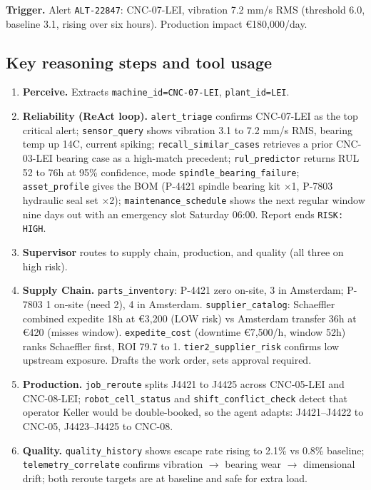 \documentclass[11pt,a4paper]{article}
\let\oldsubsection\subsection
\renewcommand{\subsection}{\needspace{5\baselineskip}\oldsubsection}
\newcommand{\tool}[1]{\texttt{#1}}
\begin{document}
\textbf{Trigger.} Alert \texttt{ALT-22847}: CNC-07-LEI, vibration 7.2 mm/s RMS (threshold 6.0, baseline 3.1, rising over six hours). Production impact \euro{}180{,}000/day.

\subsection*{Key reasoning steps and tool usage}
\begin{enumerate}
  \item \textbf{Perceive.} Extracts \texttt{machine\_id=CNC-07-LEI}, \texttt{plant\_id=LEI}.
  \item \textbf{Reliability (ReAct loop).} \tool{alert\_triage} confirms CNC-07-LEI as the top critical alert; \tool{sensor\_query} shows vibration 3.1 to 7.2 mm/s RMS, bearing temp up 14\textdegree C, current spiking; \tool{recall\_similar\_cases} retrieves a prior CNC-03-LEI bearing case as a high-match precedent; \tool{rul\_predictor} returns RUL 52 to 76h at 95\% confidence, mode \texttt{spindle\_bearing\_failure}; \tool{asset\_profile} gives the BOM (P-4421 spindle bearing kit $\times$1, P-7803 hydraulic seal set $\times$2); \tool{maintenance\_schedule} shows the next regular window nine days out with an emergency slot Saturday 06:00. Report ends \texttt{RISK: HIGH}.
  \item \textbf{Supervisor} routes to supply chain, production, and quality (all three on high risk).
  \item \textbf{Supply Chain.} \tool{parts\_inventory}: P-4421 zero on-site, 3 in Amsterdam; P-7803 1 on-site (need 2), 4 in Amsterdam. \tool{supplier\_catalog}: Schaeffler combined expedite 18h at \euro{}3{,}200 (LOW risk) vs Amsterdam transfer 36h at \euro{}420 (misses window). \tool{expedite\_cost} (downtime \euro{}7{,}500/h, window 52h) ranks Schaeffler first, ROI 79.7 to 1. \tool{tier2\_supplier\_risk} confirms low upstream exposure. Drafts the work order, sets approval required.
  \item \textbf{Production.} \tool{job\_reroute} splits J4421 to J4425 across CNC-05-LEI and CNC-08-LEI; \tool{robot\_cell\_status} and \tool{shift\_conflict\_check} detect that operator Keller would be double-booked, so the agent adapts: J4421--J4422 to CNC-05, J4423--J4425 to CNC-08.
  \item \textbf{Quality.} \tool{quality\_history} shows escape rate rising to 2.1\% vs 0.8\% baseline; \tool{telemetry\_correlate} confirms vibration $\rightarrow$ bearing wear $\rightarrow$ dimensional drift; both reroute targets are at baseline and safe for extra load.

\end{enumerate}
\end{document}
